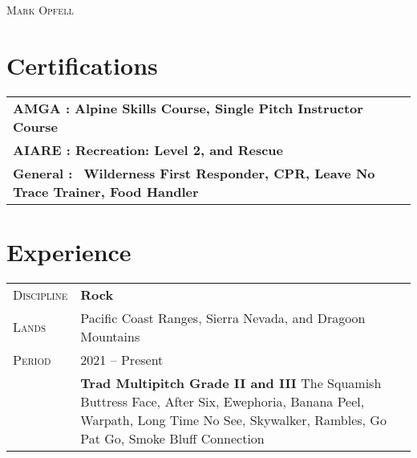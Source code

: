 \documentclass[a4paper, oneside, final]{scrartcl}
\newcommand{\gray}{\rowcolor[gray]{.90}} %
\begin{document}
\begin{center} %

\pdfpageheight 11in 
\pdfpagewidth 8.5in


{\fontsize{36}{36}\selectfont\scshape Mark Opfell} 
\vspace{1.16 cm} %


\section{Certifications}
\begin{tabular}{ @{} >{\bfseries}l @{\hspace{6ex}} l }
\textbf{AMGA} \normalfont :
\quad Alpine Skills Course, Single Pitch Instructor Course \\
\textbf{AIARE} \normalfont :
\quad \normalfont Recreation: Level 2, and Rescue \\
\textbf{General} \normalfont :
 \normalfont \,\,\,Wilderness First Responder, CPR, Leave No Trace Trainer, Food Handler \\
\end{tabular}

\section{Experience}

\begin{tabularx}{0.97\linewidth}{>{\raggedleft\scshape}p{2cm}X}
\gray Discipline & \textbf{Rock}\\
\gray Lands & Pacific Coast Ranges, Sierra Nevada, and Dragoon Mountains \hfill \\
\gray Period & 2021 -- Present\\
&
\vspace{-0.15 cm}
\textbf{Trad Multipitch Grade II and III}
\newline
The Squamish Buttress Face, After Six, Ewephoria, Banana Peel, Warpath, Long Time No See, Skywalker, Rambles, Go Pat Go, Smoke Bluff Connection


\end{tabularx}
\end{center}
\end{document}
